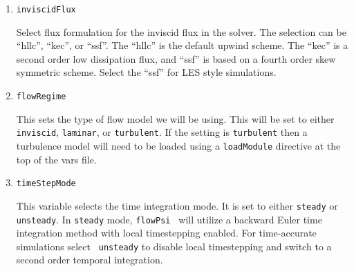 \documentclass{article}
\begin{document}
\begin{enumerate}
\begin{itemize}
{\tt inSphere} takes two arguments, {\tt radius} and {\tt center},
which define the sphere size and location, respectively.

\item {\tt inCylinder}

{\tt inCylinder} takes three arguments, {\tt radius}, {\tt p1}, and
{\tt p2}.  The endpoints of the axis are defined by the points {\tt
  p1} and {\tt p2}.

\item {\tt inCone}

{\tt inCone } takes four arguments.  Like {\tt inCylinder}, it uses
two endpoints of the axis, while {\tt r1} and {\tt r2} define the
respective radii at each endpoint.

\item {\tt leftPlane}

{\tt leftPlane} takes two arguments, {\tt point} and {\tt normal}.
{\tt point} defines a point on the plane, while {\tt normal} gives a
vector normal to the plane.  All points on the opposing side of the
plane (away from the normal) are included in this geometry.

\end{itemize}

\item {\tt inviscidFlux}

  Select flux formulation for the inviscid flux in the solver.  The
  selection can be ``hllc'', ``kec'', or ``ssf''.  The ``hllc'' is the
  default upwind scheme.  The ``kec'' is a second order low
  dissipation flux, and ``ssf'' is based on a fourth order skew
  symmetric scheme.  Select the ``ssf'' for LES style simulations.

\item {\tt flowRegime }

This sets the type of flow model we will be using.  This will be set
to either {\tt inviscid}, {\tt laminar}, or {\tt turbulent}.  If the
setting is {\tt turbulent} then a turbulence model will need to be
loaded using a {\tt loadModule} directive at the top of the vars file.  

\item {\tt timeStepMode }

This variable selects the time integration mode.  It is set to either
{\tt steady} or {\tt unsteady}.  In {\tt steady} mode, {\tt flowPsi }
will utilize a backward Euler time integration method with local
timestepping enabled.  For time-accurate simulations select {\tt
  unsteady} to disable local timestepping and switch to a second order
temporal integration.


\end{enumerate}
\end{document}
